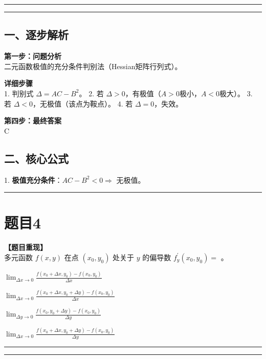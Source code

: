 \documentclass[12pt, a4paper]{ctexart}
\newcommand{\TopSeparator}{
    \par\noindent\rule{\textwidth}{1.5pt}\vspace{0.5em} %
}
\newcommand{\AnalysisSeparator}{
    \par\noindent\rule{\textwidth}{0.5pt}\vspace{0.2em}\hrule\vspace{0.5em} %
}
\newenvironment{RedAnalysis}{
    \par
    \color{red} %
}{
    \par
    \color{black} %
}
\newcommand{\choicesTwo}[4]{
    \begin{enumerate}[label=\Alph*., itemsep=0pt, parsep=0pt, topsep=5pt, labelsep=0.5em]
        \begin{minipage}{0.45\linewidth} \item #1 \end{minipage}
        \begin{minipage}{0.45\linewidth} \item #2 \end{minipage}
        \begin{minipage}{0.45\linewidth} \item #3 \end{minipage}
        \begin{minipage}{0.45\linewidth} \item #4 \end{minipage}
    \end{enumerate}
}
\begin{document}
\AnalysisSeparator

\begin{RedAnalysis}

\subsection*{一、逐步解析}

\textbf{第一步：问题分析} \\
二元函数极值的充分条件判别法（Hessian矩阵行列式）。

\textbf{详细步骤} \\
1. 判别式 $\Delta = AC - B^2$。
2. 若 $\Delta > 0$，有极值（$A>0$极小，$A<0$极大）。
3. 若 $\Delta < 0$，无极值（该点为鞍点）。
4. 若 $\Delta = 0$，失效。

\textbf{第四步：最终答案} \\
C

\subsection*{二、核心公式}
1. \textbf{极值充分条件}：$AC-B^2<0 \Rightarrow$ 无极值。

\end{RedAnalysis}

\vspace{2em}

\TopSeparator
\section*{题目4}

\textbf{【题目重现】} \\
多元函数 $ f(x, y) $ 在点 $ (x_{0}, y_{0}) $ 处关于 $ y $ 的偏导数 $ f_{y}^{\prime}(x_{0}, y_{0}) = $ \underline{\hspace{1cm}}。
\choicesTwo
{$ \lim_{\Delta x \to 0} \frac{f(x_0 + \Delta x, y_0) - f(x_0, y_0)}{\Delta x} $}
{$ \lim_{\Delta x \to 0} \frac{f(x_0 + \Delta x, y_0 + \Delta y) - f(x_0, y_0)}{\Delta x} $}
{$ \lim_{\Delta y \to 0} \frac{f(x_0, y_0 + \Delta y) - f(x_0, y_0)}{\Delta y} $}
{$ \lim_{\Delta x \to 0} \frac{f(x_0 + \Delta x, y_0 + \Delta y) - f(x_0, y_0)}{\Delta y} $}

\AnalysisSeparator
\end{document}
